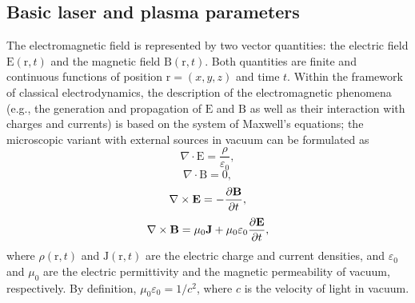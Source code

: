 \documentclass[10pt, a4paper, twoside, openright]{report}
\renewcommand{\vec}[1]{\boldsymbol{\mathrm{#1}}}
\newcommand{\rot}[1]{\nabla \times #1}
\renewcommand{\div}[1]{\nabla \cdot #1}
\begin{document}
\subsection{Basic laser and plasma parameters\label{sec:laser_plasma_params}}

The electromagnetic field is represented by two vector quantities: the electric field $ \vec{E} \left( \vec{r}, t \right) $ and the magnetic field $ \vec{B} \left( \vec{r}, t \right) $. Both quantities are finite and continuous functions of position $ \vec{r} = \left( x, y, z \right) $ and time $ t $. Within the framework of classical electrodynamics, the description of the electromagnetic phenomena (e.g., the generation and propagation of $ \vec{E} $ and $ \vec{B} $ as well as their interaction with charges and currents) is based on the system of Maxwell's equations; the microscopic variant with external sources in vacuum can be formulated as
\begin{equation}\label{eq:gauss_law_for_e}
	\div{\vec{E}} = \frac{\rho}{\varepsilon_0},
\end{equation}
\begin{equation}\label{eq:gauss_law_for_b}
	\div{\vec{B}} = 0,
\end{equation}
\begin{equation}\label{eq:faraday_law}
	\rot{\vec{E}} = -\diffp{\vec{B}}{t},
\end{equation}
\begin{equation}\label{eq:ampere_law}
	\rot{\vec{B}} = \mu_0 \vec{J} + \mu_0 \varepsilon_0 \diffp{\vec{E}}{t},
\end{equation}
where $ \rho \left( \vec{r}, t \right) $ and $ \vec{J} \left( \vec{r}, t \right) $ are the electric charge and current densities, and $ \varepsilon_0 $ and $ \mu_0 $ are the electric permittivity and the magnetic permeability of vacuum, respectively. By definition, $ \mu_0 \varepsilon_0 = 1 / c^2 $, where $ c $ is the velocity of light in vacuum.
\end{document}
